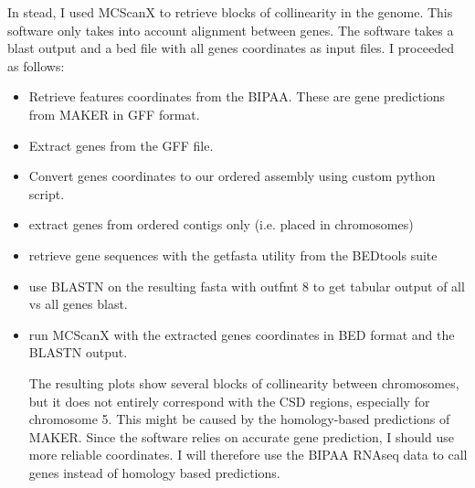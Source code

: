 \documentclass[10pt,a4paper]{report}
\begin{document}
In stead, I used MCScanX to retrieve blocks of collinearity in the genome. This software only takes into account alignment between genes. The software takes a blast output and a bed file with all genes coordinates as input files. I proceeded as follows:
\begin{itemize}
\item Retrieve features coordinates from the BIPAA. These are gene predictions from MAKER in GFF format.
\item Extract genes from the GFF file.
\item Convert genes coordinates to our ordered assembly using custom python script.
\item extract genes from ordered contigs only (i.e. placed in chromosomes)
\item retrieve gene sequences with the getfasta utility from the BEDtools suite
\item use BLASTN on the resulting fasta with outfmt 8 to get tabular output of all vs all genes blast.
\item run MCScanX with the extracted genes coordinates in BED format and the BLASTN output.

The resulting plots show several blocks of collinearity between chromosomes, but it does not entirely correspond with the CSD regions, especially for chromosome 5. This might be caused by the homology-based predictions of MAKER. Since the software relies on accurate gene prediction, I should use more reliable coordinates. I will therefore use the BIPAA RNAseq data to call genes instead of homology based predictions.


\end{itemize}
\end{document}
